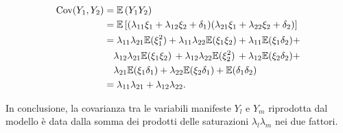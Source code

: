 \documentclass[
  11pt,
]{krantz}
\newcommand{\E}{\mathbb{E}} %
\theoremstyle{definition}
\theoremstyle{definition}
\theoremstyle{definition}
\theoremstyle{definition}
\theoremstyle{remark}
\begin{document}
\begin{equation}
\begin{aligned}
  \mbox{Cov}(Y_1, Y_2) &= \E\left( Y_1 Y_2\right) \notag\\
  &= \E \left[ 
  (\lambda_{11} \xi_1 + \lambda_{12} \xi_2 + \delta_1)
   (\lambda_{21} \xi_1 + \lambda_{22} \xi_2 +  \delta_2)
  \right]\notag\\
  &= \lambda_{11} \lambda_{21} \E (\xi_1^2) +
      \lambda_{11} \lambda_{22} \E (\xi_1 \xi_2) +\notag 
      \lambda_{11} \E (\xi_1 \delta_2) +\notag\\
    &\quad \lambda_{12} \lambda_{21}\E(\xi_1 \xi_2)\, + 
      \lambda_{12} \lambda_{22}\E(\xi^2_2)\, + 
      \lambda_{12} \E (\xi_2\delta_2) +\notag\\
    &\quad \lambda_{21} \E(\xi_1\delta_1) +\notag 
     \lambda_{22} \E(\xi_2\delta_1) + \E(\delta_1 \delta_2)\notag\\
   &= \lambda_{11} \lambda_{21} + \lambda_{12} \lambda_{22}.\notag
\end{aligned}
\end{equation}

In conclusione, la covarianza tra le variabili manifeste \(Y_l\) e \(Y_m\) riprodotta dal modello è data dalla somma dei prodotti delle saturazioni \(\lambda_l \lambda_m\) nei due fattori.
\end{document}
